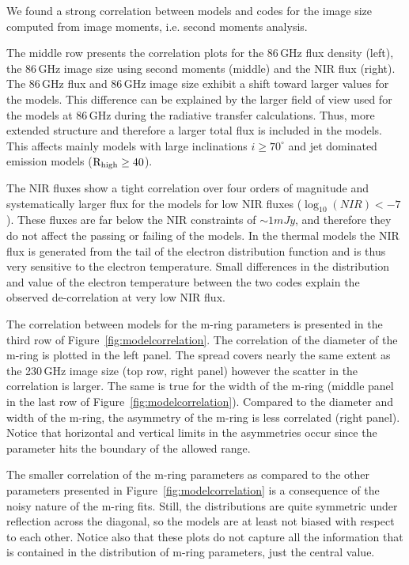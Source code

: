 We found a strong correlation between models and codes for the image size computed from image moments, i.e. second moments analysis.

The middle row presents the correlation plots for the 86\,GHz flux density (left), the 86\,GHz image size using second moments (middle) and the NIR flux (right). The 86\,GHz flux and 86\,GHz image size exhibit a shift toward larger values for the \bhac models. This difference can be explained by the larger field of view used for the \bhac models at 86\,GHz during the radiative transfer calculations. Thus, more extended structure and therefore a larger total flux is included in the \bhac models. This affects mainly models with large inclinations $i\geq70^\circ$ and jet dominated emission models ($\rm{R}_{\rm high}\geq 40$).

The NIR fluxes show a tight correlation over four orders of magnitude and systematically larger flux for the \bhac models for low NIR fluxes ($\log_{10}(NIR)<-7$). These fluxes are far below the NIR constraints of $\sim 1mJy$, and therefore they do not affect the passing or failing of the models. In the thermal models the NIR flux is generated from the tail of the electron distribution function and is thus very sensitive to the electron temperature. Small differences in the distribution and value of the electron temperature between the two codes explain the observed de-correlation at very low NIR flux. 

The correlation between models for the m-ring parameters is presented in the third row of Figure~\ref{fig:modelcorrelation}. The correlation of the diameter of the m-ring is plotted in the left panel. The spread covers nearly the same extent as the 230\,GHz image size (top row, right panel) however the scatter in the correlation is larger.  The same is true for the width of the m-ring (middle panel in the last row of Figure~\ref{fig:modelcorrelation}). Compared to the diameter and width of the m-ring, the asymmetry of the m-ring is less correlated (right panel). Notice that horizontal and vertical limits in the asymmetries occur since the parameter hits the boundary of the allowed range.

The smaller correlation of the m-ring parameters as compared to the other parameters presented in Figure~\ref{fig:modelcorrelation} is a consequence of the noisy nature of the m-ring fits.  Still, the distributions are quite symmetric under reflection across the diagonal, so the models are at least not biased with respect to each other.  Notice also that these plots do not capture all the information that is contained in the distribution of m-ring parameters, just the central value.   

